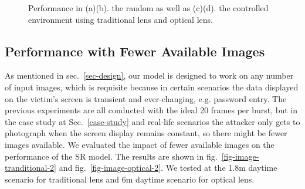 \begin{figure}[!t]
    \centering
    \hfill
    \caption{Performance in (a)(b). the random as well as (c)(d). the controlled environment using traditional lens and optical lens.}
    \label{fig:control_random}
\end{figure}


\subsection{Performance with Fewer Available Images}
As mentioned in sec.~\ref{sec-design}, our model is designed to work on any number of input images, which is requisite because in certain scenarios the data displayed on the victim's screen is transient and ever-changing, e.g. password entry. The previous experiments are all conducted with the ideal 20 frames per burst, but in the case study at Sec.~\ref{case-study} and real-life scenarios the attacker only gets to photograph when the screen display remains constant, so there might be fewer images available. We evaluated the impact of fewer available images on the performance of the SR model. The results are shown in fig.~\ref{fig-image-tranditional-2} and fig.~\ref{fig-image-optical-2}. We tested at the 1.8m daytime scenario for traditional lens and 6m daytime scenario for optical lens.

